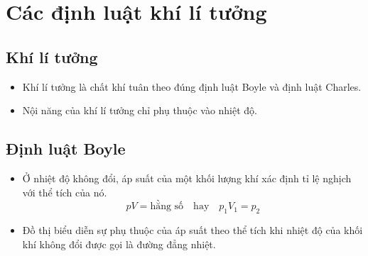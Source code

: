 \section{Các định luật khí lí tưởng}
\subsection{Khí lí tưởng}
\begin{itemize}
	\item Khí lí tưởng là chất khí tuân theo đúng định luật Boyle và định luật Charles.
	\item Nội năng của khí lí tưởng chỉ phụ thuộc vào nhiệt độ.
\end{itemize}
\subsection{Định luật Boyle}
\begin{itemize}
	\item Ở nhiệt độ không đổi, áp suất của một khối lượng khí xác định tỉ lệ nghịch với thể tích	của nó.
	$$pV=\text{hằng số}\quad \text{hay}\quad p_1V_1=p_2$$
	\item Đồ thị biểu diễn sự phụ thuộc của áp suất theo thể tích khi nhiệt độ của khối khí không đổi được gọi là đường đẳng nhiệt.
	\begin{center}
	\end{center}
\end{itemize}

